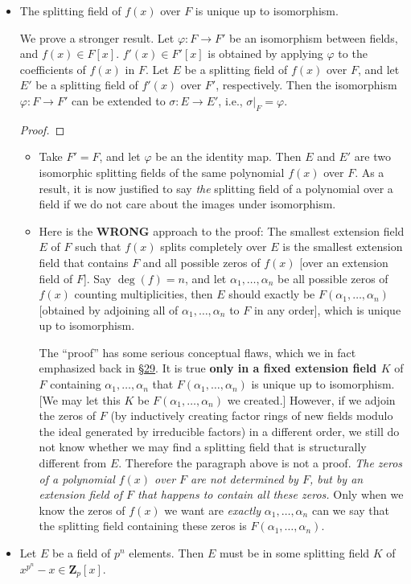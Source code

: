 \documentclass[11pt]{article}
\newcommand{\lk}[2]{\hyperlink{subsection.#1.#2}{\S#2}} %
\newcommand{\Z}{\mathbf{Z}}
\renewcommand{\phi}{\varphi}
\begin{document}
\begin{itemize}
    \item The splitting field of $f(x)$ over $F$ is unique up to isomorphism.
    
    We prove a stronger result. Let $\phi\colon F \to F'$ be an isomorphism between fields, and $f(x) \in F[x]$. $f'(x) \in F'[x]$ is obtained by applying $\phi$ to the coefficients of $f(x)$ in $F$. Let $E$ be a splitting field of $f(x)$ over $F$, and let $E'$ be a splitting field of $f'(x)$ over $F'$, respectively. Then the isomorphism $\phi\colon F \to F'$ can be extended to $\sigma\colon E \to E'$, i.e., $\sigma|_F = \phi$.
    \begin{proof}
        
    \end{proof}
    \begin{itemize}
        \item Take $F' = F$, and let $\phi$ be an the identity map. Then $E$ and $E'$ are two isomorphic splitting fields of the same polynomial $f(x)$ over $F$. As a result, it is now justified to say \emph{the} splitting field of a polynomial over a field if we do not care about the images under isomorphism.
        \item Here is the \textbf{WRONG} approach to the proof: The smallest extension field $E$ of $F$ such that $f(x)$ splits completely over $E$ is the smallest extension field that contains $F$ and all possible zeros of $f(x)$ [over an extension field of $F$]. Say $\deg(f) = n$, and let $\alpha_1,\dots,\alpha_n$ be all possible zeros of $f(x)$ counting multiplicities, then $E$ should exactly be $F(\alpha_1,\dots,\alpha_n)$ [obtained by adjoining all of $\alpha_1,\dots,\alpha_n$ to $F$ in any order], which is unique up to isomorphism.
        
        The ``proof'' has some serious conceptual flaws, which we in fact emphasized back in \lk{6}{29}. It is true \textbf{only in a fixed extension field $K$} of $F$ containing $\alpha_1,\dots,\alpha_n$ that $F(\alpha_1,\dots,\alpha_n)$ is unique up to isomorphism. [We may let this $K$ be $F(\alpha_1,\dots,\alpha_n)$ we created.] However, if we adjoin the zeros of $F$ (by inductively creating factor rings of new fields modulo the ideal generated by irreducible factors) in a different order, we still do not know whether we may find a splitting field that is structurally different from $E$. Therefore the paragraph above is not a proof. \emph{The zeros of a polynomial $f(x)$ over $F$ are not determined by $F$, but by an extension field of $F$ that happens to contain all these zeros.} Only when we know the zeros of $f(x)$ we want are \emph{exactly} $\alpha_1,\dots,\alpha_n$ can we say that the splitting field containing these zeros is $F(\alpha_1,\dots,\alpha_n)$.
    \end{itemize}
    \item Let $E$ be a field of $p^n$ elements. Then $E$ must be in some splitting field $K$ of $x^{p^n}-x \in \Z_p[x]$.


\end{itemize}
\end{document}
